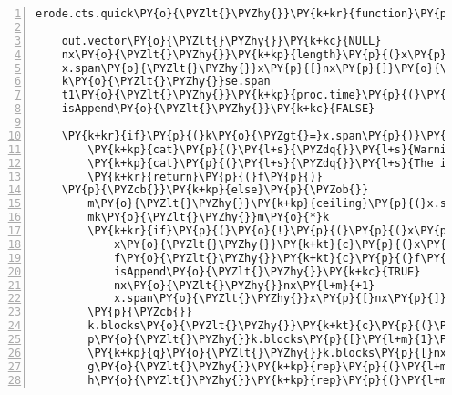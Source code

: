 \begin{Verbatim}[commandchars=\\\{\},codes={\catcode`\$=3\catcode`\^=7\catcode`\_=8},gobble=0,numbers=left,fontfamily=fvm,fontshape=n,fontsize=\footnotesize,tabsize=2]
erode.cts.quick\PY{o}{\PYZlt{}\PYZhy{}}\PY{k+kr}{function}\PY{p}{(}x\PY{p}{,}f\PY{p}{,}se.span\PY{p}{)}\PY{p}{\PYZob{}}

	out.vector\PY{o}{\PYZlt{}\PYZhy{}}\PY{k+kc}{NULL}
	nx\PY{o}{\PYZlt{}\PYZhy{}}\PY{k+kp}{length}\PY{p}{(}x\PY{p}{)}
	x.span\PY{o}{\PYZlt{}\PYZhy{}}x\PY{p}{[}nx\PY{p}{]}\PY{o}{\PYZhy{}}x\PY{p}{[}\PY{l+m}{1}\PY{p}{]}
	k\PY{o}{\PYZlt{}\PYZhy{}}se.span
	t1\PY{o}{\PYZlt{}\PYZhy{}}\PY{k+kp}{proc.time}\PY{p}{(}\PY{p}{)}\PY{p}{[}\PY{l+m}{3}\PY{p}{]}
	isAppend\PY{o}{\PYZlt{}\PYZhy{}}\PY{k+kc}{FALSE}
	
	\PY{k+kr}{if}\PY{p}{(}k\PY{o}{\PYZgt{}=}x.span\PY{p}{)}\PY{p}{\PYZob{}}
		\PY{k+kp}{cat}\PY{p}{(}\PY{l+s}{\PYZdq{}}\PY{l+s}{Warning: structuring element spans the entire input set \PYZbs{}n\PYZdq{}}\PY{p}{)}
		\PY{k+kp}{cat}\PY{p}{(}\PY{l+s}{\PYZdq{}}\PY{l+s}{The input f vector has been output \PYZbs{}n\PYZdq{}}\PY{p}{)}
		\PY{k+kr}{return}\PY{p}{(}f\PY{p}{)}
	\PY{p}{\PYZcb{}}\PY{k+kp}{else}\PY{p}{\PYZob{}}
		m\PY{o}{\PYZlt{}\PYZhy{}}\PY{k+kp}{ceiling}\PY{p}{(}x.span\PY{o}{/}k\PY{p}{)}
		mk\PY{o}{\PYZlt{}\PYZhy{}}m\PY{o}{*}k
		\PY{k+kr}{if}\PY{p}{(}\PY{o}{!}\PY{p}{(}\PY{p}{(}x\PY{p}{[}\PY{l+m}{1}\PY{p}{]}\PY{o}{+}mk\PY{p}{)} \PY{o}{==} x\PY{p}{[}nx\PY{p}{]}\PY{p}{)}\PY{p}{)}\PY{p}{\PYZob{}}
			x\PY{o}{\PYZlt{}\PYZhy{}}\PY{k+kt}{c}\PY{p}{(}x\PY{p}{,}x\PY{p}{[}\PY{l+m}{1}\PY{p}{]}\PY{o}{+}mk\PY{p}{)}
			f\PY{o}{\PYZlt{}\PYZhy{}}\PY{k+kt}{c}\PY{p}{(}f\PY{p}{,}\PY{o}{+}\PY{k+kc}{Inf}\PY{p}{)}
			isAppend\PY{o}{\PYZlt{}\PYZhy{}}\PY{k+kc}{TRUE}
			nx\PY{o}{\PYZlt{}\PYZhy{}}nx\PY{l+m}{+1}
			x.span\PY{o}{\PYZlt{}\PYZhy{}}x\PY{p}{[}nx\PY{p}{]}\PY{o}{\PYZhy{}}x\PY{p}{[}\PY{l+m}{1}\PY{p}{]}
		\PY{p}{\PYZcb{}}
		k.blocks\PY{o}{\PYZlt{}\PYZhy{}}\PY{k+kt}{c}\PY{p}{(}\PY{l+m}{0}\PY{p}{,}\PY{k+kp}{findInterval}\PY{p}{(}x\PY{p}{,}\PY{k+kp}{seq}\PY{p}{(}x\PY{p}{[}\PY{l+m}{1}\PY{p}{]}\PY{p}{,}x\PY{p}{[}\PY{l+m}{1}\PY{p}{]}\PY{o}{+}\PY{p}{(}m\PY{l+m}{\PYZhy{}1}\PY{p}{)}\PY{o}{*}k\PY{p}{,}by\PY{o}{=}k\PY{p}{)}\PY{p}{)}\PY{p}{,}m\PY{l+m}{+1}\PY{p}{)}
		p\PY{o}{\PYZlt{}\PYZhy{}}k.blocks\PY{p}{[}\PY{l+m}{1}\PY{p}{]}
		\PY{k+kp}{q}\PY{o}{\PYZlt{}\PYZhy{}}k.blocks\PY{p}{[}nx\PY{l+m}{+2}\PY{p}{]}
		g\PY{o}{\PYZlt{}\PYZhy{}}\PY{k+kp}{rep}\PY{p}{(}\PY{l+m}{0}\PY{p}{,}nx\PY{p}{)}
		h\PY{o}{\PYZlt{}\PYZhy{}}\PY{k+kp}{rep}\PY{p}{(}\PY{l+m}{0}\PY{p}{,}nx\PY{p}{)}

\end{Verbatim}
